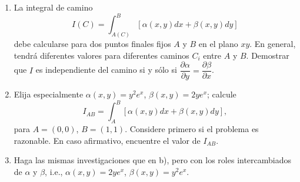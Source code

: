 \documentclass[12pt,a4paper]{article}
\begin{document}
    \begin{problema}
        \begin{enumerate}
            \item[a)] La integral de camino
            \begin{equation*}
                I(C)=\int_{A(C)}^{B}\left[\alpha(x,y)dx+\beta(x,y)dy\right]
            \end{equation*}
            debe calcularse para dos puntos finales fijos $A$ y $B$ en el plano $xy$. En
            general, tendrá diferentes valores para diferentes caminos $C_{i}$ entre $A$ y $B$.
            Demostrar que $I$ es independiente del camino si y sólo si $\dfrac{\partial\alpha}{\partial y}=\dfrac{\partial\beta}{\partial x}$.
            \item[b)] Elija especialmente $\alpha(x,y)=y^{2}e^{x}$, $\beta(x,y)=2ye^{x}$; calcule
            \begin{equation*}
                I_{AB}=\int_{A}^{B}\left[\alpha(x,y)dx+\beta(x,y)dy\right],
            \end{equation*}
            para $A=(0,0)$, $B=(1,1)$. Considere primero si el problema es razonable. En caso
            afirmativo, encuentre el valor de $I_{AB}$.
            \item[c)] Haga las mismas investigaciones que en b), pero con los roles
            intercambiados de $\alpha$ y $\beta$, i.e., $\alpha(x,y)=2ye^{x}$, $\beta(x,y)=y^{2}e^{x}$.
        \end{enumerate}
    \end{problema}
\end{document}
